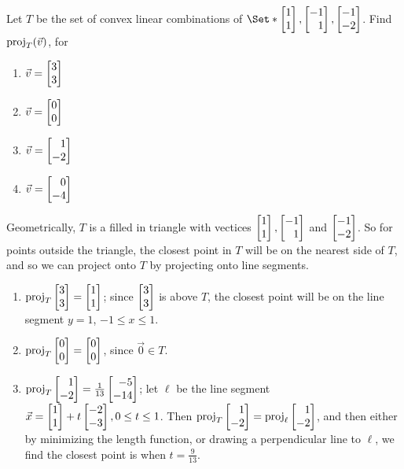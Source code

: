 \begin{exercises}
\begin{problist}
		\prob Let $T$ be the set of convex linear combinations of
		$\Set*{\mat{1\\1}, \mat{-1\\1},\mat{-1\\-2}}$. Find $\operatorname{proj}_{T}(\vec
		v)$, for
		\begin{enumerate}
			\item $\vec v = \mat{3\\3}$

			\item $\vec v = \mat{0\\0}$

			\item $\vec v = \mat{1\\-2}$

			\item $\vec v = \mat{0\\-4}$
		\end{enumerate}
		\begin{solution}
			Geometrically, $T$ is a filled in triangle with vectices
			$\mat{1\\1}, \mat{-1\\1}$ and $\mat{-1\\-2}$. So for points
			outside the triangle, the closest point in $T$ will be on
			the nearest side of $T$, and so we can project onto $T$
			by projecting onto line segments.


			\begin{enumerate}
				\item $\Proj_{T} \mat{3\\3}= \mat{1\\1}$; since
					$\mat{3\\3}$ is above $T$, the closest point
					will be on the line segment $y=1$,
					$-1\leq x \leq 1$.

				\item $\Proj_{T} \mat{0\\0}= \mat{0\\0}$, since
					$\vec 0\in T$.

				\item $\Proj_{T} \mat{1\\-2}= \frac{1}{13}\mat{-5\\-14}$;
					let $\ell$ be the line segment
					$\vec x= \mat{1\\1}+t\mat{-2\\-3}, 0\leq
					t \leq 1$. Then $\Proj_{T} \mat{1\\-2}= \Proj_{\ell}
					\mat{1\\-2}$, and then either by
					minimizing the length function, or
					drawing a perpendicular line to $\ell$, we
					find the closest point is when $t=\frac{9}{13}$.


\end{enumerate}
\end{solution}
\end{problist}
\end{exercises}

